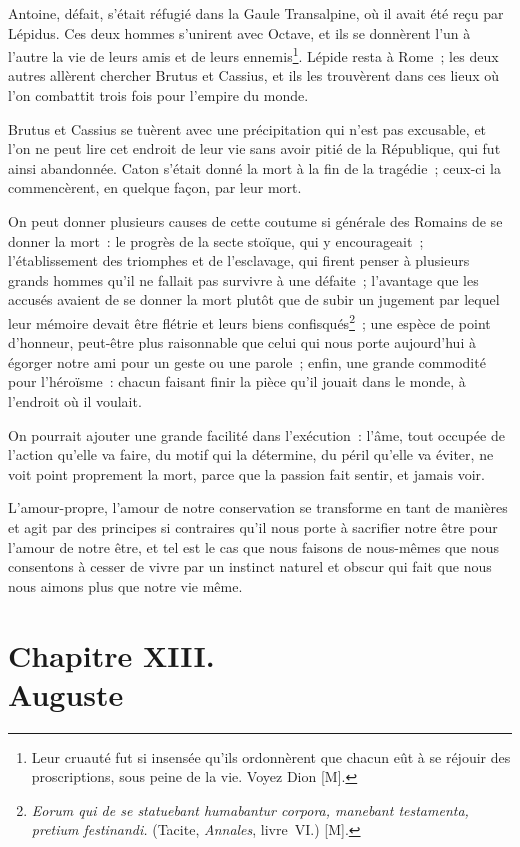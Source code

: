 \documentclass[french,twoside]{book} %
\newcommand\chapteropen{} %
\newcommand\chapterclose{} %
\begin{document}
Antoine, défait, s’était réfugié dans la Gaule Transalpine, où il avait été reçu par Lépidus. Ces deux hommes s’unirent avec Octave, et ils se donnèrent l’un à l’autre la vie de leurs amis et de leurs ennemis\footnote{Leur cruauté fut si insensée qu’ils ordonnèrent que chacun eût à se réjouir des proscriptions, sous peine de la vie. Voyez Dion [M].}. Lépide resta à Rome ; les deux autres allèrent chercher Brutus et Cassius, et ils les trouvèrent dans ces lieux où l’on combattit trois fois pour l’empire du monde.\par
Brutus et Cassius se tuèrent avec une précipitation qui n’est pas excusable, et l’on ne peut lire cet endroit de leur vie sans avoir pitié de la République, qui fut ainsi abandonnée. Caton s’était donné la mort à la fin de la tragédie ; ceux-ci la commencèrent, en quelque façon, par leur mort.\par
On peut donner plusieurs causes de cette coutume si générale des Romains de se donner la mort : le progrès de la secte stoïque, qui y encourageait ; l’établissement des triomphes et de l’esclavage, qui firent penser à plusieurs grands hommes qu’il ne fallait pas survivre à une défaite ; l’avantage que les accusés avaient de se donner la mort plutôt que de subir un jugement par lequel leur mémoire devait être flétrie et leurs biens confisqués\footnote{{\itshape Eorum qui de se statuebant humabantur corpora, manebant testamenta, pretium festinandi.} (Tacite, {\itshape Annales}, livre VI.) [M].} ; une espèce de point d’honneur, peut-être plus raisonnable que celui qui nous porte aujourd’hui à égorger notre ami pour un geste ou une parole ; enfin, une grande commodité pour l’héroïsme : chacun faisant finir la pièce qu’il jouait dans le monde, à l’endroit où il voulait.\par
On pourrait ajouter une grande facilité dans l’exécution : l’âme, tout occupée de l’action qu’elle va faire, du motif qui la détermine, du péril qu’elle va éviter, ne voit point proprement la mort, parce que la passion fait sentir, et jamais voir.\par
L’amour-propre, l’amour de notre conservation se transforme en tant de manières et agit par des principes si contraires qu’il nous porte à sacrifier notre être pour l’amour de notre être, et tel est le cas que nous faisons de nous-mêmes que nous consentons à cesser de vivre par un instinct naturel et obscur qui fait que nous nous aimons plus que notre vie même.
\chapterclose


\chapteropen
\chapter[{Chapitre XIII. Auguste}]{Chapitre XIII. \\
Auguste}
\label{considérations\_Romains\_chap\_13}\renewcommand{\leftmark}{Chapitre XIII. \\
Auguste}
\end{document}
